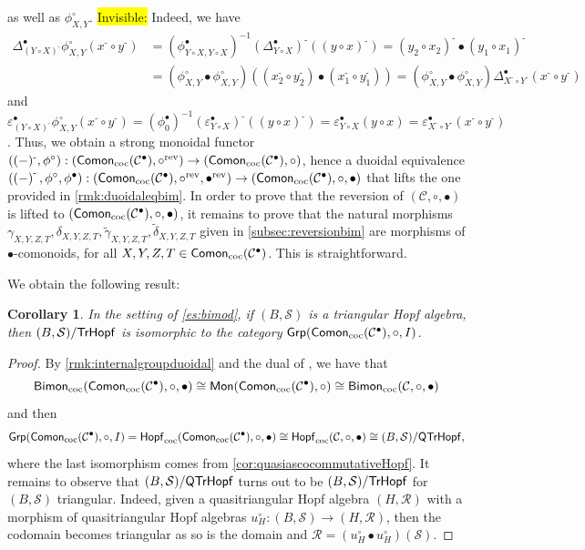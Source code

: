 \documentclass[nosumlimits,twoside]{amsart}
\newtheorem{corollary}[corollary]{\sc Corollary}
\theoremstyle{definition}
\theoremstyle{remark}
\def\rev{\mathrm{rev}}
\def\revsn{\text{-}}
\newenvironment{invisible}{{\noindent\sc \colorbox{yellow}{Invisible:}\;}\color{gray}}{\medskip}
\newcommand{\as}[1]{{\color{blue}{#1}}}
\newcommand{\Cc}{\mathcal{C}}
\newcommand{\Rr}{\mathcal{R}}
\newcommand{\Ss}{\mathcal{S}}
\def\Grp{{\sf Grp}}
\def\cHopfmon{{\sf Hopf}_{\mathrm{coc}}}
\def\cBimon{{\sf Bimon}_{\mathrm{coc}}}
\def\cComon{{\sf Comon}_{\mathrm{coc}}}
\def\TrHopf{{\sf TrHopf}}
\def\QTrHopf{{\sf QTrHopf}}
\begin{document}
as well as 
$\phi^{\circ}_{X,Y}$. 
\begin{invisible}
Indeed, we have
\[
\begin{split}
\Delta^{\bullet}_{(Y\circ X)^{\revsn}}\phi^{\circ}_{X,Y}(x^{\revsn}\circ y^{\revsn})&=(\phi^{\bullet}_{Y\circ X,Y\circ X})^{-1}(\Delta_{Y\circ X}^{\bullet})^{\revsn}((y\circ x)^{\revsn})=(y_{2}\circ x_{2})^{\revsn}\bullet(y_{1}\circ x_{1})^{\revsn}\\&=(\phi^{\circ}_{X,Y}\bullet\phi^{\circ}_{X,Y})((x_{2}^{\revsn}\circ y_{2}^{\revsn})\bullet(x_{1}^{\revsn}\circ y_{1}^{\revsn}))=(\phi^{\circ}_{X,Y}\bullet\phi^{\circ}_{X,Y})\Delta^{\bullet}_{X^{\revsn}\circ Y^{\revsn}}(x^{\revsn}\circ y^{\revsn})
\end{split}
\]
and $\varepsilon^{\bullet}_{(Y\circ X)^{\revsn}}\phi^{\circ}_{X,Y}(x^{\revsn}\circ y^{\revsn})=(\phi^{\bullet}_{0})^{-1}(\varepsilon^{\bullet}_{Y\circ X})^{\revsn}((y\circ x)^{\revsn})=\varepsilon^{\bullet}_{Y\circ X}(y\circ x)=\varepsilon^{\bullet}_{X^{\revsn}\circ Y^{\revsn}}(x^{\revsn}\circ y^{\revsn})$.
\end{invisible}
Thus, we obtain a strong monoidal functor $((-)^{\revsn},\phi^{\circ}):(\cComon(\Cc^{\bullet}),\circ^\rev)\to(\cComon(\Cc^{\bullet}),\circ)$, hence a duoidal equivalence $\left( \left( -\right)^{\revsn },\phi^\circ,\phi^{\bullet} \right):(\cComon(\Cc^{\bullet}),\circ^\rev,\bullet^{\rev})\to(\cComon(\Cc^{\bullet}),\circ,\bullet)$ that lifts the one provided in \cref{rmk:duoidaleqbim}. In order to prove that the reversion of $(\Cc,\circ,\bullet)$ is lifted to $(\cComon(\Cc^{\bullet}),\circ,\bullet)$, it remains to prove that the natural morphisms $\gamma_{X,Y,Z,T},\delta_{X,Y,Z,T},\widetilde{\gamma}_{X,Y,Z,T},\widetilde{\delta}_{X,Y,Z,T}$ given in \cref{subsec:reversionbim} are morphisms of $\bullet$-comonoids, for all $X,Y,Z,T\in\cComon(\Cc^{\bullet})$. This is straightforward.

\medskip We obtain the following result:

\begin{corollary}\label{coro:trHopfasgroups}
    In the setting of \cref{es:bimod}, if $(B,\Ss)$ is a triangular Hopf algebra, then $(B,\Ss)/\TrHopf$ is isomorphic to the category $\Grp(\cComon(\Cc^\bullet),\circ,I)$.
\end{corollary}

\begin{proof}
By \cref{rmk:internalgroupduoidal} and the dual of \cite[Proposition 6.37]{Aguiar}, we have that
 \[
\cBimon(\cComon(\Cc^{\bullet}),\circ,\bullet)\cong\mathsf{Mon}(\cComon(\Cc^{\bullet}),\circ)\cong\cBimon(\Cc,\circ,\bullet)
\]
and then \[\Grp(\cComon(\Cc^\bullet),\circ,I)=\cHopfmon(\cComon(\Cc^{\bullet}),\circ,\bullet)\cong\cHopfmon(\Cc,\circ,\bullet)\cong (B,\Ss)/\QTrHopf,\] where the last isomorphism comes from \cref{cor:quasiascocommutativeHopf}. It remains to observe that $(B,\Ss)/\QTrHopf$ turns out to be $(B,\Ss)/\TrHopf$ for $(B,\Ss)$ triangular. Indeed, given a quasitriangular Hopf algebra $(H,\Rr)$ with a morphism of quasitriangular Hopf algebras $u_{H}^{\circ}:(B,\Ss)\to (H,\Rr)$, then the codomain becomes triangular as so is the domain and $\Rr=(u_{H}^{\circ}\bullet u_{H}^{\circ})(\Ss)$.
\end{proof}
\end{document}
